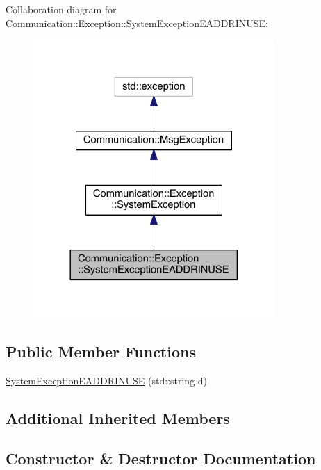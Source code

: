 Collaboration diagram for Communication\+:\+:Exception\+:\+:System\+Exception\+E\+A\+D\+D\+R\+I\+N\+U\+S\+E\+:\nopagebreak
\begin{figure}[H]
\begin{center}
\leavevmode
\includegraphics[width=260pt]{class_communication_1_1_exception_1_1_system_exception_e_a_d_d_r_i_n_u_s_e__coll__graph}
\end{center}
\end{figure}
\subsection*{Public Member Functions}
\begin{DoxyCompactItemize}
\item 
\hyperlink{class_communication_1_1_exception_1_1_system_exception_e_a_d_d_r_i_n_u_s_e_a9b504ae53ff353a93e68d4fc7079ef99}{System\+Exception\+E\+A\+D\+D\+R\+I\+N\+U\+S\+E} (std\+::string d)
\end{DoxyCompactItemize}
\subsection*{Additional Inherited Members}


\subsection{Constructor \& Destructor Documentation}
\hypertarget{class_communication_1_1_exception_1_1_system_exception_e_a_d_d_r_i_n_u_s_e_a9b504ae53ff353a93e68d4fc7079ef99}{}
